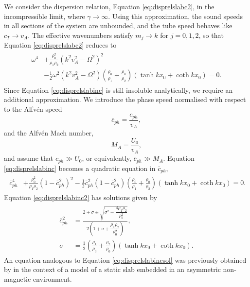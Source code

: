 We consider the dispersion relation, Equation \eqref{eq:disprelslabc2}, in the incompressible limit, where $\gamma \to \infty$.
Using this approximation, the sound speeds in all sections of the system are unbounded, and the tube speed behaves like $c_T \to v_A$.
The effective wavenumbers satisfy $m_j \to k$ for $j = 0, 1, 2$, so that Equation \eqref{eq:disprelslabc2} reduces to
%
\begin{align}
\label{eq:disprelslabinc}
\begin{split}
\omega^4
& + \frac{\rho_0^2}{\rho_1 \rho_2} ( k^2 v_A^2 - \Omega^2 )^2
\\
& - \frac{1}{2} \omega^2 ( k^2 v_A^2 - \Omega^2)
\left( \frac{\rho_0}{\rho_1} + \frac{\rho_0}{\rho_2} \right)
\left( \tanh k x_0 + \coth k x_0 \right) = 0.
\end{split}
\end{align}
%
Since Equation \eqref{eq:disprelslabinc} is still insoluble analytically, we require an additional approximation.
We introduce the phase speed normalised with respect to the Alfv\'en speed
%
\begin{equation}
\label{eq:cphbar}
\bar c_{ph} = \frac{c_{ph}}{v_A},
\end{equation}
%
and the Alfv\'en Mach number,
%
\begin{equation}
\label{eq:MA}
M_A = \frac{U_0}{v_A},
\end{equation}
%
and assume that $c_{ph} \gg U_0$, or equivalently, $\bar c_{ph} \gg M_A$.
Equation \eqref{eq:disprelslabinc} becomes a quadratic equation in $\bar c_{ph}$,
%
\begin{align}
\label{eq:disprelslabinc2}
\begin{split}
\bar c_{ph}^4
& + \frac{\rho_0^2}{\rho_1 \rho_2} ( 1 - \bar c_{ph}^2 )^2
- \frac{1}{2} \bar c_{ph}^2 ( 1 - \bar c_{ph}^2)
\left( \frac{\rho_0}{\rho_1} + \frac{\rho_0}{\rho_2} \right)
\left( \tanh k x_0 + \coth k x_0 \right) = 0.
\end{split}
\end{align}
%
Equation \eqref{eq:disprelslabinc2} has solutions given by
%
\begin{align}
\label{eq:disprelslabincsol}
\begin{split}
\bar c_{ph}^2 
& = \frac
{2 + \sigma \pm \sqrt{\sigma^2 - \dfrac{4\rho_1 \rho_2}{\rho_0^2} } }
{2 \left( 1 + \sigma + \dfrac{\rho_1 \rho_2}{\rho_0^2} \right) },
\\[0.3cm]
\sigma
& = \frac{1}{2} \left( \frac{\rho_1}{\rho_0} + \frac{\rho_2}{\rho_0} \right)
(\tanh k x_0 + \coth k x_0).
\end{split}
\end{align}
%
An equation analogous to Equation \eqref{eq:disprelslabincsol} was previously obtained by \cite{Allcock2017} in the context of a model of a static slab embedded in an asymmetric non-magnetic environment.



